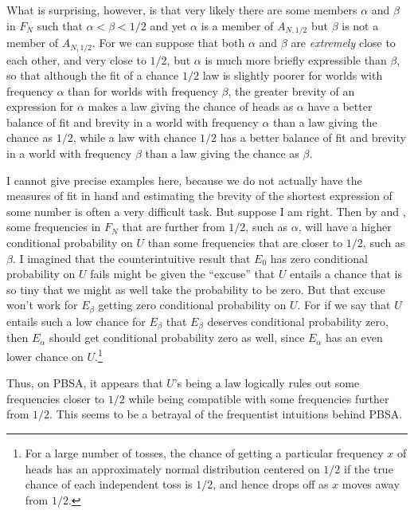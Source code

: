 What is surprising, however, is that very likely there are some members $\alpha$ and $\beta$ in $F_N$ such that $\alpha<\beta<1/2$
and yet $\alpha$ is a member of $A_{N,1/2}$ but $\beta$ is not a member of $A_{N,1/2}$. For we can suppose that both $\alpha$ and $\beta$
are \textit{extremely} close to each other, and very close to $1/2$, but $\alpha$ is much more briefly expressible than $\beta$, so that 
although the fit of a chance $1/2$ law is slightly poorer for worlds with frequency $\alpha$ than for worlds with frequency $\beta$,
the greater brevity of an expression for $\alpha$ makes a law giving the chance of heads as $\alpha$ have a better balance of fit and
brevity in a world with frequency $\alpha$ than a law giving the chance as $1/2$, while a law with chance $1/2$ has a better balance of fit and brevity in 
a world with frequency $\beta$ than a law giving the chance as $\beta$.

I cannot give precise examples here, because
we do not actually have the measures of fit in hand and estimating the brevity of the shortest expression of some number is often a very
difficult task. But suppose I am right. Then by  and , some frequencies in $F_N$ that are further from
$1/2$, such as $\alpha$, will have a higher conditional probability on $U$ than some frequencies that are closer to $1/2$, such as
$\beta$. I imagined that the counterintuitive result that $E_0$ has zero conditional probability on $U$ fails might be given the ``excuse''
that $U$ entails a chance that is so tiny that we might as well take the probability to be zero. But that excuse won't work for $E_\beta$
getting zero conditional probability on $U$. For if we say that $U$ entails such a low chance for $E_\beta$ that $E_\beta$ deserves
conditional probability zero, then $E_\alpha$ should get conditional probability zero as well, since $E_\alpha$ has an even lower chance
on $U$.\footnote{For a large number of tosses, the chance of getting a particular frequency $x$ of heads has an approximately normal distribution 
centered on $1/2$ if the true chance of each independent toss is $1/2$, and hence drops off as $x$ moves away from $1/2$.}

Thus, on PBSA, it appears that $U$'s being a law logically rules out some frequencies closer to $1/2$ while 
being compatible with some frequencies further from $1/2$. This seems to be a betrayal of the frequentist
intuitions behind PBSA. 

